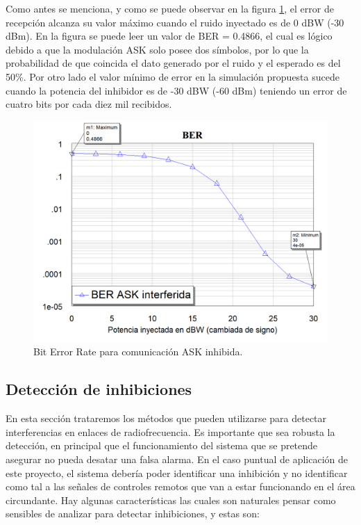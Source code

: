 Como antes se menciona, y como se puede observar en la figura \ref{BER_ask}, el error de recepción alcanza su valor máximo cuando el ruido 
inyectado es de 0 dBW (-30 dBm). En la figura se puede leer un valor de BER = 0.4866, el cual es lógico debido a que la modulación ASK solo 
posee dos símbolos, por lo que la probabilidad de que coincida el dato generado por el ruido y el esperado es del 50\%. Por otro lado el valor
mínimo de error en la simulación propuesta sucede cuando la potencia del inhibidor es de -30 dBW (-60 dBm) teniendo un error de cuatro bits 
por cada diez mil recibidos.

\begin{figure}[htb]
	\centering
	\includegraphics[scale=0.37]{images/BER_ask.png}
    \caption{Bit Error Rate para comunicación ASK inhibida.}
	\label{BER_ask}
\end{figure}

\subsection{Detección de inhibiciones}

En esta sección trataremos los métodos que pueden utilizarse para detectar interferencias en enlaces de radiofrecuencia. Es importante que 
sea robusta la detección, en principal que el funcionamiento del sistema que se pretende asegurar no pueda desatar una falsa alarma. En el caso
puntual de aplicación de este proyecto, el sistema debería poder identificar una inhibición y no identificar como tal a las señales de controles 
remotos que van a estar funcionando en el área circundante. 
Hay algunas características las cuales son naturales pensar como sensibles de analizar para detectar inhibiciones, y estas son: 

